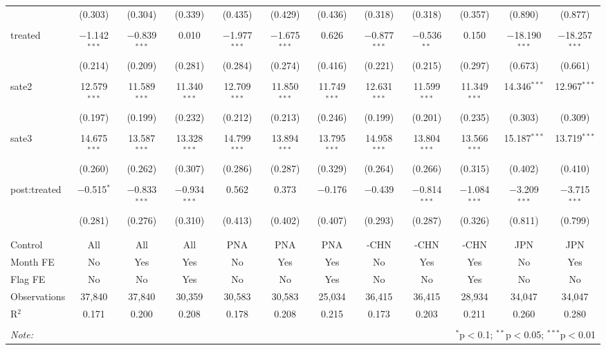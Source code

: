\documentclass[11pt,]{article}
\begin{document}
\begin{landscape}
\begin{table}[!htbp]
\begin{tabular}{@{\extracolsep{1pt}}lccccccccccc}
  & (0.303) & (0.304) & (0.339) & (0.435) & (0.429) & (0.436) & (0.318) & (0.318) & (0.357) & (0.890) & (0.877) \\ 
  & & & & & & & & & & & \\ 
 treated & $-$1.142$^{***}$ & $-$0.839$^{***}$ & 0.010 & $-$1.977$^{***}$ & $-$1.675$^{***}$ & 0.626 & $-$0.877$^{***}$ & $-$0.536$^{**}$ & 0.150 & $-$18.190$^{***}$ & $-$18.257$^{***}$ \\ 
  & (0.214) & (0.209) & (0.281) & (0.284) & (0.274) & (0.416) & (0.221) & (0.215) & (0.297) & (0.673) & (0.661) \\ 
  & & & & & & & & & & & \\ 
 sate2 & 12.579$^{***}$ & 11.589$^{***}$ & 11.340$^{***}$ & 12.709$^{***}$ & 11.850$^{***}$ & 11.749$^{***}$ & 12.631$^{***}$ & 11.599$^{***}$ & 11.349$^{***}$ & 14.346$^{***}$ & 12.967$^{***}$ \\ 
  & (0.197) & (0.199) & (0.232) & (0.212) & (0.213) & (0.246) & (0.199) & (0.201) & (0.235) & (0.303) & (0.309) \\ 
  & & & & & & & & & & & \\ 
 sate3 & 14.675$^{***}$ & 13.587$^{***}$ & 13.328$^{***}$ & 14.799$^{***}$ & 13.894$^{***}$ & 13.795$^{***}$ & 14.958$^{***}$ & 13.804$^{***}$ & 13.566$^{***}$ & 15.187$^{***}$ & 13.719$^{***}$ \\ 
  & (0.260) & (0.262) & (0.307) & (0.286) & (0.287) & (0.329) & (0.264) & (0.266) & (0.315) & (0.402) & (0.410) \\ 
  & & & & & & & & & & & \\ 
 post:treated & $-$0.515$^{*}$ & $-$0.833$^{***}$ & $-$0.934$^{***}$ & 0.562 & 0.373 & $-$0.176 & $-$0.439 & $-$0.814$^{***}$ & $-$1.084$^{***}$ & $-$3.209$^{***}$ & $-$3.715$^{***}$ \\ 
  & (0.281) & (0.276) & (0.310) & (0.413) & (0.402) & (0.407) & (0.293) & (0.287) & (0.326) & (0.811) & (0.799) \\ 
  & & & & & & & & & & & \\ 
\hline \\[-1.8ex] 
Control & All & All & All & PNA & PNA & PNA & -CHN & -CHN & -CHN & JPN & JPN \\ 
Month FE & No & Yes & Yes & No & Yes & Yes & No & Yes & Yes & No & Yes \\ 
Flag FE & No & No & Yes & No & No & Yes & No & No & Yes & No & No \\ 
Observations & 37,840 & 37,840 & 30,359 & 30,583 & 30,583 & 25,034 & 36,415 & 36,415 & 28,934 & 34,047 & 34,047 \\ 
R$^{2}$ & 0.171 & 0.200 & 0.208 & 0.178 & 0.208 & 0.215 & 0.173 & 0.203 & 0.211 & 0.260 & 0.280 \\ 
\hline 
\hline \\[-1.8ex] 
\textit{Note:}  & \multicolumn{11}{r}{$^{*}$p$<$0.1; $^{**}$p$<$0.05; $^{***}$p$<$0.01} \\ 
\end{tabular} 
\end{table} 

\end{landscape}
\clearpage
\end{document}
